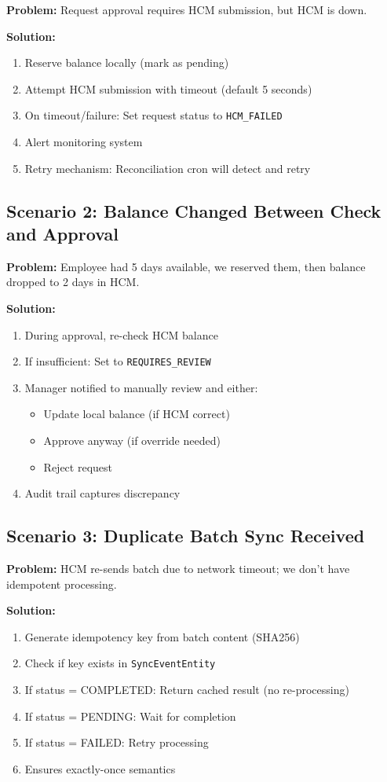 \documentclass[12pt,a4paper]{article}
\begin{document}
\textbf{Problem:} Request approval requires HCM submission, but HCM is down.

\textbf{Solution:}
\begin{enumerate}
    \item Reserve balance locally (mark as pending)
    \item Attempt HCM submission with timeout (default 5 seconds)
    \item On timeout/failure: Set request status to \texttt{HCM\_FAILED}
    \item Alert monitoring system
    \item Retry mechanism: Reconciliation cron will detect and retry
\end{enumerate}

\subsection{Scenario 2: Balance Changed Between Check and Approval}

\textbf{Problem:} Employee had 5 days available, we reserved them, then balance dropped to 2 days in HCM.

\textbf{Solution:}
\begin{enumerate}
    \item During approval, re-check HCM balance
    \item If insufficient: Set to \texttt{REQUIRES\_REVIEW}
    \item Manager notified to manually review and either:
        \begin{itemize}
            \item Update local balance (if HCM correct)
            \item Approve anyway (if override needed)
            \item Reject request
        \end{itemize}
    \item Audit trail captures discrepancy
\end{enumerate}

\subsection{Scenario 3: Duplicate Batch Sync Received}

\textbf{Problem:} HCM re-sends batch due to network timeout; we don't have idempotent processing.

\textbf{Solution:}
\begin{enumerate}
    \item Generate idempotency key from batch content (SHA256)
    \item Check if key exists in \texttt{SyncEventEntity}
    \item If status = COMPLETED: Return cached result (no re-processing)
    \item If status = PENDING: Wait for completion
    \item If status = FAILED: Retry processing
    \item Ensures exactly-once semantics
\end{enumerate}
\end{document}
